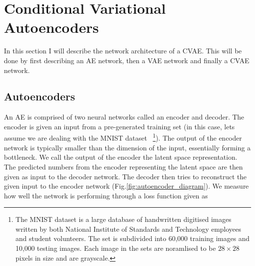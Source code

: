 \section{Conditional Variational Autoencoders}\label{sec:cvae_intro}

In this section I will describe the network architecture of a 
\ac{CVAE}. This will be done by first describing an \ac{AE} network, then 
a \ac{VAE} network and finally a \ac{CVAE} network.

%
%
\subsection{Autoencoders}

An \ac{AE} is 
comprised of two neural networks called an 
encoder and decoder. The encoder is given an input 
from a pre-generated training set (in this case, lets assume 
we are dealing with the MNIST dataset~\cite{lecun-mnisthandwrittendigit-2010}
\footnote{The MNIST dataset is a large database of handwritten 
digitised images written by both National Institute of Standards and 
Technology employees and student volunteers. The set is subdivided into 
60,000 training images and 10,000 testing images. Each image in the sets 
are noramlised to be $28\times28$ pixels in size and are grayscale.}). The output of the 
encoder network is typically smaller than the dimension of 
the input, essentially forming a bottleneck. 
We call the output of the encoder the latent space representation. 
The predicted numbers from the encoder representing the latent 
space are then given as input to the decoder network. The 
decoder then tries to reconstruct the given input to the 
encoder network (Fig.\ref{fig:autoencoder_diagram}). We measure how well the network is performing 
through a loss function given as 

